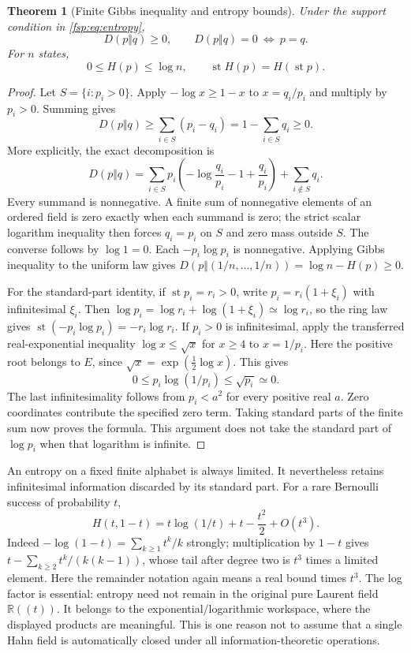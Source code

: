 \documentclass[11pt,a4paper]{article}
\numberwithin{equation}{section}
\newtheorem{theorem}{Theorem}[section]
\theoremstyle{definition}
\theoremstyle{remark}
\newcommand{\R}{\mathbb R}
\newcommand{\st}{\operatorname{st}}
\begin{document}
\begin{theorem}[Finite Gibbs inequality and entropy bounds]
\label{fsp:thm:kl}
Under the support condition in \eqref{fsp:eq:entropy},
\begin{equation}
 D(p\Vert q)\ge0,
 \qquad D(p\Vert q)=0\ \Longleftrightarrow\ p=q.
\end{equation}
For $n$ states,
\begin{equation}\label{fsp:eq:entropybound}
 0\le H(p)\le\log n,
 \qquad \st H(p)=H(\st p).
\end{equation}
\end{theorem}
\begin{proof}
Let $S=\{i:p_i>0\}$. Apply $-\log x\ge1-x$ to $x=q_i/p_i$ and
multiply by $p_i>0$. Summing gives
\begin{equation}
 D(p\Vert q)\ge\sum_{i\in S}(p_i-q_i)
 =1-\sum_{i\in S}q_i\ge0.
\end{equation}
More explicitly, the exact decomposition is
\[
 D(p\Vert q)=\sum_{i\in S}p_i
 \left(-\log\frac{q_i}{p_i}-1+\frac{q_i}{p_i}\right)
 +\sum_{i\notin S}q_i.
\]
Every summand is nonnegative. A finite sum of nonnegative elements of
an ordered field is zero exactly when each summand is zero; the strict
scalar logarithm inequality then forces $q_i=p_i$ on $S$ and zero
mass outside $S$. The converse follows by $\log1=0$. Each $-p_i\log p_i$ is nonnegative. Applying
Gibbs inequality to the uniform law gives
$D(p\Vert(1/n,\ldots,1/n))=\log n-H(p)\ge0$.

For the standard-part identity, if $\st p_i=r_i>0$, write
$p_i=r_i(1+\xi_i)$ with infinitesimal $\xi_i$. Then
$\log p_i=\log r_i+\log(1+\xi_i)\simeq\log r_i$, so the ring
law gives $\st(-p_i\log p_i)=-r_i\log r_i$.
If $p_i>0$ is infinitesimal, apply the transferred real-exponential
inequality $\log x\le\sqrt{x}$ for $x\ge4$ to $x=1/p_i$.
Here the positive root belongs to $E$, since
$\sqrt{x}=\exp(\tfrac12\log x)$. This gives
\[
 0\le p_i\log(1/p_i)\le\sqrt{p_i}\simeq0.
\]
The last infinitesimality follows from $p_i<a^2$ for every positive
real $a$. Zero coordinates contribute the specified zero term. Taking
standard parts of the finite sum now proves the formula. This argument
does not take the standard part of $\log p_i$ when that logarithm is infinite.
\end{proof}

An entropy on a fixed finite alphabet is always limited. It nevertheless
retains infinitesimal information discarded by its standard part. For a
rare Bernoulli success of probability $t$,
\begin{equation}\label{fsp:eq:rareentropy}
 H(t,1-t)=t\log(1/t)+t-\frac{t^2}{2}+O(t^3).
\end{equation}
Indeed $-\log(1-t)=\sum_{k\ge1}t^k/k$ strongly; multiplication by
$1-t$ gives $t-\sum_{k\ge2}t^k/(k(k-1))$, whose tail after degree two
is $t^3$ times a limited element. Here the remainder notation again means
a real bound times $t^3$.
The log factor is essential: entropy need not remain in the original
pure Laurent field $\R((t))$. It belongs to the exponential/logarithmic
workspace, where the displayed products are meaningful. This is one
reason not to assume that a single Hahn field is automatically closed
under all information-theoretic operations.
\end{document}
